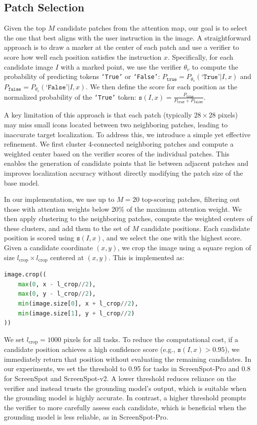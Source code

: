 \documentclass{article}
\begin{document}
\subsection{Patch Selection}
\label{appendix:patch_selection}
Given the top $M$ candidate patches from the attention map, our goal is to select the one that best aligns with the user instruction in the image. A straightforward approach is to draw a marker at the center of each patch and use a verifier to score how well each position satisfies the instruction $x$. Specifically, for each candidate image $I$ with a marked point, we use the verifier $\theta_v$ to compute the probability of predicting tokens \texttt{`True'} or \texttt{`False'}: 
$P_{\texttt{true}} = P_{\theta_v}(\texttt{`True'}|I,x)$ and $P_{\texttt{false}} = P_{\theta_v}(\texttt{`False'}|I,x)$. We then define the score for each position as the normalized probability of the \texttt{`True'} token: $\texttt{s}(I,x)=\frac{P_{\texttt{true}}}{P_{\texttt{true}} + P_{\texttt{false}}}$.


A key limitation of this approach is that each patch (typically $28 \times 28$ pixels) may miss small icons located between two neighboring patches, leading to inaccurate target localization. To address this, we introduce a simple yet effective refinement. We first cluster 4-connected neighboring patches and compute a weighted center based on the verifier scores of the individual patches. This enables the generation of candidate points that lie between adjacent patches and improves localization accuracy without directly modifying the patch size of the base model.

In our implementation, we use up to $M=20$ top-scoring patches, filtering out those with attention weights below 20\% of the maximum attention weight. We then apply clustering to the neighboring patches, compute the weighted centers of these clusters, and add them to the set of $M$ candidate positions. Each candidate position is scored using $\texttt{s}(I,x)$, and we select the one with the highest score. Given a candidate coordinate $(x, y)$, we crop the image using a square region of size $l_{\text{crop}} \times l_{\text{crop}}$ centered at $(x, y)$. This is implemented as:
\begin{lstlisting}[language=Python]
image.crop((
    max(0, x - l_crop//2),
    max(0, y - l_crop//2),
    min(image.size[0], x + l_crop//2),
    min(image.size[1], y + l_crop//2)
))
\end{lstlisting}
We set $l_{\text{crop}} = 1000$ pixels for all tasks. To reduce the computational cost, if a candidate position achieves a high confidence score (e.g., $\texttt{s}(I, x) > 0.95$), we immediately return that position without evaluating the remaining candidates. In our experiments, we set the threshold to 0.95 for tasks in ScreenSpot-Pro and 0.8 for ScreenSpot and ScreenSpot-v2. A lower threshold reduces reliance on the verifier and instead trusts the grounding model’s output, which is suitable when the grounding model is highly accurate. In contrast, a higher threshold prompts the verifier to more carefully assess each candidate, which is beneficial when the grounding model is less reliable, as in ScreenSpot-Pro.
\end{document}
